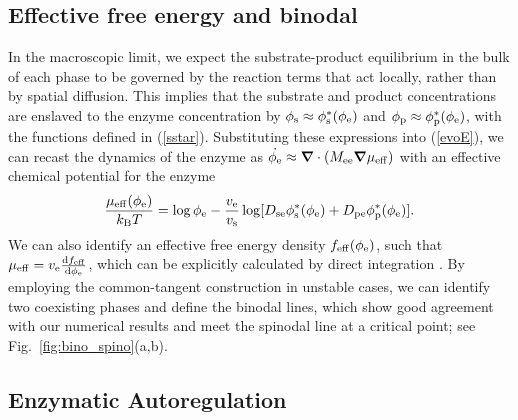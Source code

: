 \subsection{Effective free energy and binodal}

In the macroscopic limit, we expect the substrate-product equilibrium in the bulk of each phase to be governed by the reaction terms that act locally, rather than by spatial diffusion. This implies that the substrate and product concentrations are enslaved to the enzyme concentration by $\phi_{\mathrm{s}} \approx \phi_{\mathrm{s}}^*(\phi_{\mathrm{e}})$ and $\phi_{\mathrm{p}} \approx \phi_{\mathrm{p}}^*(\phi_{\mathrm{e}})$, with the functions defined in (\ref{sstar}). Substituting these expressions into (\ref{evoE}), we can recast the dynamics of the enzyme as $\dot{\phi_{\mathrm{e}}}\approx \bm{\nabla} \cdot (M_{\mathrm{ee}}\bm{\nabla}\mu_\mathrm{eff})$ with an effective chemical potential for the enzyme
\begin{equation}
    \frac{\mu_\mathrm{eff}(\phi_{\mathrm{e}})}{k_{\rm B} T} =  \log \phi_{\mathrm{e}} - \frac{v_{\mathrm{e}}}{v_{\mathrm{s}}} \log[D_{\mathrm{se}} \phi_{\mathrm{s}}^* (\phi_{\mathrm{e}}) + D_{\mathrm{pe}} \phi_{\mathrm{p}}^*(\phi_{\mathrm{e}})].
\end{equation}
We can also identify an effective free energy density $f_\mathrm{eff}(\phi_{\mathrm{e}})$, such that $\mu_\mathrm{eff}=v_{\mathrm{e}}\frac{\mathrm{d} f_\mathrm{eff}}{\mathrm{d} \phi_{\mathrm{e}}}$, which can be explicitly calculated by direct integration \cite{suppmat}. 
By employing the common-tangent construction in unstable cases, we can identify two coexisting phases and define the binodal lines, which show good agreement with our numerical results and meet the spinodal line at a critical point; see Fig.~\ref{fig:bino_spino}(a,b).

\subsection{Enzymatic Autoregulation}

